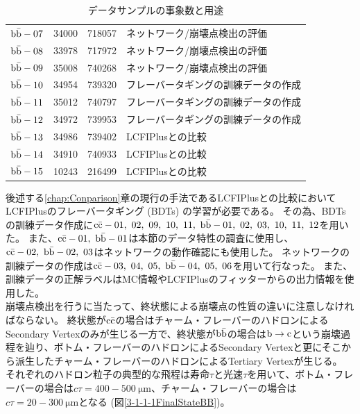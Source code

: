 \begin{table}[htbp]
\begin{tabular}{c c c l}
    $\rm b\bar{b}-07$ & 34000 & 718057 & ネットワーク/崩壊点検出の評価\\
    $\rm b\bar{b}-08$ & 33978 & 717972 & ネットワーク/崩壊点検出の評価\\ 
    $\rm b\bar{b}-09$ & 35008 & 740268 & ネットワーク/崩壊点検出の評価\\ \hline
    $\rm b\bar{b}-10$ & 34954 & 739320 & フレーバータギングの訓練データの作成\\ 
    $\rm b\bar{b}-11$ & 35012 & 740797 & フレーバータギングの訓練データの作成\\ 
    $\rm b\bar{b}-12$ & 34972 & 739953 & フレーバータギングの訓練データの作成\\ \hline
    $\rm b\bar{b}-13$ & 34986 & 739402 & LCFIPlusとの比較\\ 
    $\rm b\bar{b}-14$ & 34910 & 740933 & LCFIPlusとの比較\\ 
    $\rm b\bar{b}-15$ & 10243 & 216499 & LCFIPlusとの比較\\ \hline
  \end{tabular}
  \caption{データサンプルの事象数と用途}
  \label{DataSamples}
\end{table}

後述する\ref{chap:Conparison}章の現行の手法であるLCFIPlusとの比較においてLCFIPlusのフレーバータギング (BDTs) の学習が必要である。
その為、BDTsの訓練データ作成に$\rm c\bar{c}-01,\ 02,\ 09,\ 10,\ 11,\ \rm b\bar{b}-01,\ 02,\ 03,\ 10,\ 11,\ 12$を用いた。
また、$\rm c\bar{c}-01,\ b\bar{b}-01$は本節のデータ特性の調査に使用し、$\rm c\bar{c}-02,\ b\bar{b}-02,\ 03$はネットワークの動作確認にも使用した。
ネットワークの訓練データの作成は$\rm c\bar{c}-03,\ 04,\ 05,\ b\bar{b}-04,\ 05,\ 06$を用いて行なった。
また、訓練データの正解ラベルはMC情報やLCFIPlusのフィッターからの出力情報を使用した。\\

崩壊点検出を行うに当たって、終状態による崩壊点の性質の違いに注意しなければならない。
終状態が$\rm c\bar{c}$の場合はチャーム・フレーバーのハドロンによるSecondary Vertexのみが生じる一方で、終状態が$\rm b\bar{b}$の場合は$\rm b \to c$という崩壊過程を辿り、ボトム・フレーバーのハドロンによるSecondary Vertexと更にそこから派生したチャーム・フレーバーのハドロンによるTertiary Vertexが生じる。
それぞれのハドロン粒子の典型的な飛程は寿命$\tau$と光速$\tau$を用いて、ボトム・フレーバーの場合は$c \tau = 400-500 \ \mathrm{\mu m}$、チャーム・フレーバーの場合は$c \tau = 20-300 \ \mathrm{\mu m}$となる (図\ref{3-1-1-1FinalStateBB})。

